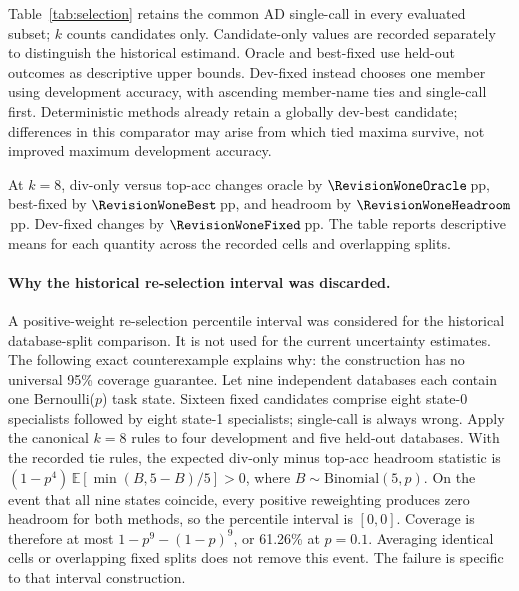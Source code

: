 Table~\ref{tab:selection} retains the common AD single-call in every evaluated
subset; $k$ counts candidates only. Candidate-only values are recorded separately
to distinguish the historical estimand. Oracle and best-fixed use
held-out outcomes as descriptive upper bounds. Dev-fixed instead chooses
one member using development accuracy, with ascending member-name ties
and single-call first. Deterministic methods already retain a globally dev-best
candidate; differences in this comparator may arise from which tied
maxima survive, not improved maximum development accuracy.

At $k=8$, div-only versus top-acc changes oracle by
$\RevisionWoneOracle$\,pp, best-fixed by $\RevisionWoneBest$\,pp,
and headroom by $\RevisionWoneHeadroom$\,pp. Dev-fixed changes by
$\RevisionWoneFixed$\,pp. The table reports descriptive means for
each quantity across the recorded cells and overlapping splits.

\begin{table}[H]
\centering\small

\caption{Historical BIRD subset-selection reanalysis. Every pool contains $k$
selected candidates plus the common single-call. Means over 18 cells and 100
overlapping database splits. Dev-fixed is chosen
only on development data; Best uses held-out outcomes.}
\label{tab:selection}
\end{table}

\paragraph{Why the historical re-selection interval was discarded.}
A positive-weight re-selection percentile interval was considered for
the historical database-split comparison. It is not used for the
current uncertainty estimates. The following exact counterexample
explains why: the construction has no universal 95\% coverage guarantee. Let nine
independent databases each contain one Bernoulli($p$) task state. Sixteen
fixed candidates comprise eight state-0 specialists followed by eight
state-1 specialists; single-call is always wrong. Apply the canonical $k=8$
rules to four development and five held-out databases. With the recorded
tie rules, the expected div-only minus top-acc headroom statistic is
$(1-p^4)\,\mathbb{E}[\min(B,5-B)/5]>0$, where $B\sim\mathrm{Binomial}(5,p)$.
On the event that all nine states coincide, every positive reweighting
produces zero headroom for both methods, so the percentile interval is
$[0,0]$. Coverage is therefore at most $1-p^9-(1-p)^9$, or 61.26\% at
$p=0.1$. Averaging identical cells or overlapping fixed splits does not
remove this event. The failure is specific to that interval construction.

